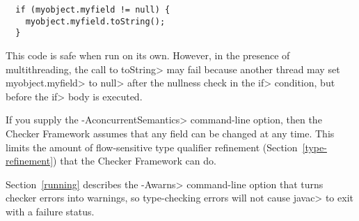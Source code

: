 \begin{Verbatim}
  if (myobject.myfield != null) {
    myobject.myfield.toString();
  }
\end{Verbatim}

\noindent
This code is safe when run on its own.
However, in the presence of multithreading, the call to \<toString> may
fail because another thread may set \<myobject.myfield> to \<null> after
the nullness check in the \<if> condition, but before the \<if> body is
executed.

If you supply the \<-AconcurrentSemantics> command-line option, then the
Checker Framework assumes that any field can be changed at any time.  This
limits the amount of flow-sensitive type qualifier refinement
(Section~\ref{type-refinement}) that the Checker Framework can do.


%
%
%
%
%
%
%



Section~\ref{running} describes the \<-Awarns> command-line
option that turns checker errors into warnings, so type-checking errors
will not cause \<javac> to exit with a failure status.



